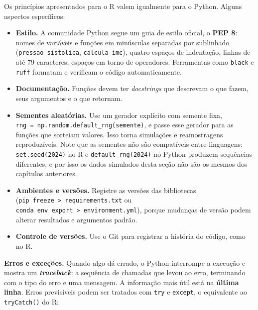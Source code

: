 \documentclass[
]{book}
\providecommand{\tightlist}{%
  \setlength{\itemsep}{0pt}\setlength{\parskip}{0pt}}
\begin{document}
Os princípios apresentados para o R valem igualmente para o Python. Alguns aspectos específicos:

\begin{itemize}
\tightlist
\item
  \textbf{Estilo.} A comunidade Python segue um guia de estilo oficial, o \textbf{PEP 8}: nomes de variáveis e funções em minúsculas separadas por sublinhado (\texttt{pressao\_sistolica}, \texttt{calcula\_imc}), quatro espaços de indentação, linhas de até 79 caracteres, espaços em torno de operadores. Ferramentas como \texttt{black} e \texttt{ruff} formatam e verificam o código automaticamente.
\item
  \textbf{Documentação.} Funções devem ter \emph{docstrings} que descrevam o que fazem, seus argumentos e o que retornam.
\item
  \textbf{Sementes aleatórias.} Use um gerador explícito com semente fixa, \texttt{rng\ =\ np.random.default\_rng(semente)}, e passe esse gerador para as funções que sorteiam valores. Isso torna simulações e reamostragens reproduzíveis. Note que as sementes não são compatíveis entre linguagens: \texttt{set.seed(2024)} no R e \texttt{default\_rng(2024)} no Python produzem sequências diferentes, e por isso os dados simulados desta seção não são os mesmos dos capítulos anteriores.
\item
  \textbf{Ambientes e versões.} Registre as versões das bibliotecas (\texttt{pip\ freeze\ \textgreater{}\ requirements.txt} ou \texttt{conda\ env\ export\ \textgreater{}\ environment.yml}), porque mudanças de versão podem alterar resultados e argumentos padrão.
\item
  \textbf{Controle de versões.} Use o Git para registrar a história do código, como no R.
\end{itemize}

\textbf{Erros e exceções.} Quando algo dá errado, o Python interrompe a execução e mostra um \textbf{\emph{traceback}}: a sequência de chamadas que levou ao erro, terminando com o tipo do erro e uma mensagem. A informação mais útil está na \textbf{última linha}. Erros previsíveis podem ser tratados com \texttt{try} e \texttt{except}, o equivalente ao \texttt{tryCatch()} do R:
\end{document}
